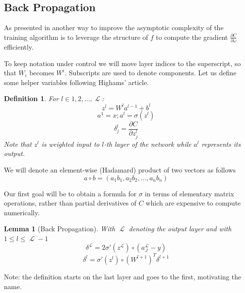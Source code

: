 \documentclass[a4paper,11pt]{article}
\theoremstyle{break}
\newtheorem{definition}{Definition}[section]
\newtheorem{lemma}[theorem]{Lemma}
\newcommand{\Part}[2]{\frac{\partial #1}{\partial #2}}
\DeclareMathOperator{\La}{\mathcal{L}}
\begin{document}
\subsection{Back Propagation}
As presented in \cite[pp11-14]{higham} another way to improve the asymptotic complexity of the training algorithm is to leverage the structure of $f$ to compute the gradient $ \frac{\partial C}{\partial \omega} $ efficiently.

To keep notation under control we will move layer indices to the superscript, so that $W_i$ becomes $ W^i $. Subscripts are used to denote components. Let us define some helper variables following Highams' article.
\begin{definition}\label{def:back_prop_helper}
For $ l \in {1, 2, \ldots, \La} $:
    $$ z^l = W^l a^{l-1} + b^{l} $$
    $$ a^1 = x; a^l = \sigma( z^l ) $$
    $$ \delta^l_j = \Part{C}{ z_j^l } $$
Note that $z^l$ is weighted input to $l$-th layer of the network while $a^l$ represents its output.
\end{definition}

We will denote an element-wise (Hadamard) product of two vectors as follows
    \newcommand{\hadam}{\circ}
    $$ a \hadam b = (a_1 b_1, a_2 b_2, \ldots, a_n b_n)$$

Our first goal will be to obtain a formula for $\sigma$ in terms of elementary matrix operations, rather than partial derivatives of $C$ which are expensive to compute numerically.

\begin{lemma}[Back Propagation]\label{lem:back_propagation}
With $\La$ denoting the output layer and with $ 1 \leq l \leq \La - 1$ 
\begin{equation}\label{eq:last_sigma}
   \delta^{\La} = 2 \sigma'(z^{\La}) \hadam (a_J^{\La} - y ) 
\end{equation}
\begin{equation}\label{eq:previous_sigma}
    \delta^l = \sigma'(z^l) \hadam (W^{l+1})^T \delta^{l+1}
\end{equation}
\end{lemma}

Note: the definition starts on the last layer and goes to the first, motivating the name.
\end{document}
